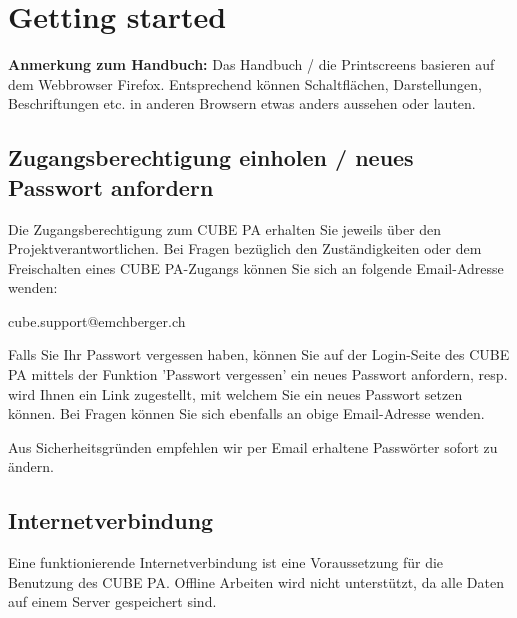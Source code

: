 
\section{Getting started}

\textbf{Anmerkung zum Handbuch:} Das Handbuch / die Printscreens basieren auf dem Webbrowser Firefox. Entsprechend können Schaltflächen, Darstellungen, Beschriftungen etc. in anderen Browsern etwas anders aussehen oder lauten.

\subsection{Zugangsberechtigung einholen / neues Passwort anfordern}


Die Zugangsberechtigung zum CUBE PA erhalten Sie jeweils über den Projektverantwortlichen. Bei Fragen bezüglich den Zuständigkeiten oder dem Freischalten eines CUBE PA-Zugangs können Sie sich an folgende Email-Adresse wenden:

\vspace{\baselineskip}

{\color{red} cube.support@emchberger.ch}

\vspace{\baselineskip}

Falls Sie Ihr Passwort vergessen haben, können Sie auf der Login-Seite des CUBE PA mittels der Funktion 'Passwort vergessen' ein neues Passwort anfordern, resp. wird Ihnen ein Link zugestellt, mit welchem Sie ein neues Passwort setzen können. Bei Fragen können Sie sich ebenfalls an obige Email-Adresse wenden.

\vspace{\baselineskip}

Aus Sicherheitsgründen empfehlen wir per Email erhaltene Passwörter sofort zu ändern.

\subsection{Internetverbindung}

Eine funktionierende Internetverbindung ist eine Voraussetzung für die Benutzung des CUBE PA. Offline Arbeiten wird nicht unterstützt, da alle Daten auf einem Server gespeichert sind.

